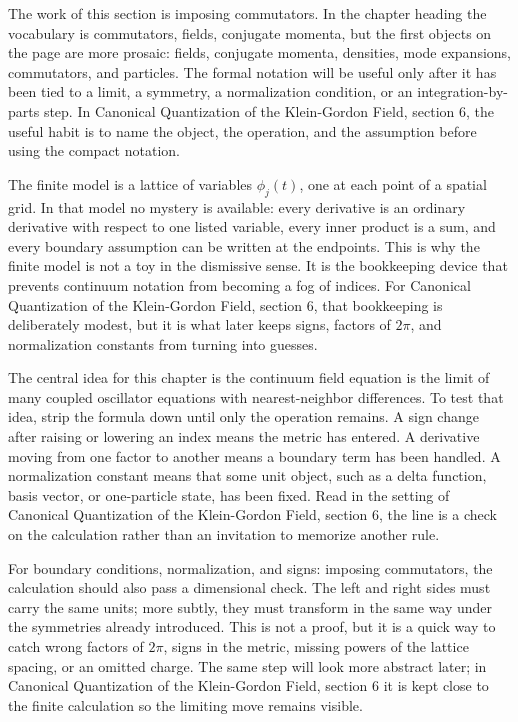 The work of this section is imposing commutators.  In the chapter heading the vocabulary is commutators, fields, conjugate momenta, but the first objects on the page are more prosaic: fields, conjugate momenta, densities, mode expansions, commutators, and particles.  The formal notation will be useful only after it has been tied to a limit, a symmetry, a normalization condition, or an integration-by-parts step.  In Canonical Quantization of the Klein-Gordon Field, section 6, the useful habit is to name the object, the operation, and the assumption before using the compact notation.

The finite model is a lattice of variables \(\phi_j(t)\), one at each point of a spatial grid.  In that model no mystery is available: every derivative is an ordinary derivative with respect to one listed variable, every inner product is a sum, and every boundary assumption can be written at the endpoints.  This is why the finite model is not a toy in the dismissive sense.  It is the bookkeeping device that prevents continuum notation from becoming a fog of indices.  For Canonical Quantization of the Klein-Gordon Field, section 6, that bookkeeping is deliberately modest, but it is what later keeps signs, factors of \(2\pi\), and normalization constants from turning into guesses.

The central idea for this chapter is the continuum field equation is the limit of many coupled oscillator equations with nearest-neighbor differences.  To test that idea, strip the formula down until only the operation remains.  A sign change after raising or lowering an index means the metric has entered.  A derivative moving from one factor to another means a boundary term has been handled.  A normalization constant means that some unit object, such as a delta function, basis vector, or one-particle state, has been fixed.  Read in the setting of Canonical Quantization of the Klein-Gordon Field, section 6, the line is a check on the calculation rather than an invitation to memorize another rule.

For boundary conditions, normalization, and signs: imposing commutators, the calculation should also pass a dimensional check.  The left and right sides must carry the same units; more subtly, they must transform in the same way under the symmetries already introduced.  This is not a proof, but it is a quick way to catch wrong factors of \(2\pi\), signs in the metric, missing powers of the lattice spacing, or an omitted charge.  The same step will look more abstract later; in Canonical Quantization of the Klein-Gordon Field, section 6 it is kept close to the finite calculation so the limiting move remains visible.

